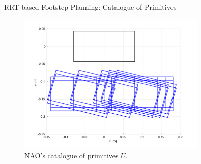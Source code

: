 \documentclass[10pt]{beamer}
\begin{document}
\begin{frame}{RRT-based Footstep Planning: Catalogue of Primitives}
	\begin{figure}
			\centering
			\includegraphics[width=0.8\textwidth]{figures/catalogue-primitives.pdf}
			\caption{NAO's catalogue of primitives $U$.}
	\end{figure}
\end{frame}
\end{document}
